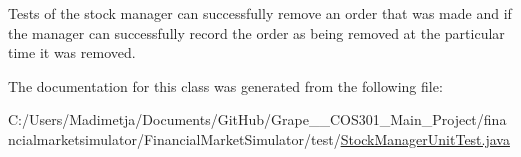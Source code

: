 Tests of the stock manager can successfully remove an order that was made and if the manager can successfully record the order as being removed at the particular time it was removed. 



The documentation for this class was generated from the following file\+:\begin{DoxyCompactItemize}
\item 
C\+:/\+Users/\+Madimetja/\+Documents/\+Git\+Hub/\+Grape\+\_\+\+\_\+\+C\+O\+S301\+\_\+\+Main\+\_\+\+Project/financialmarketsimulator/\+Financial\+Market\+Simulator/test/\hyperlink{_stock_manager_unit_test_8java}{Stock\+Manager\+Unit\+Test.\+java}\end{DoxyCompactItemize}
